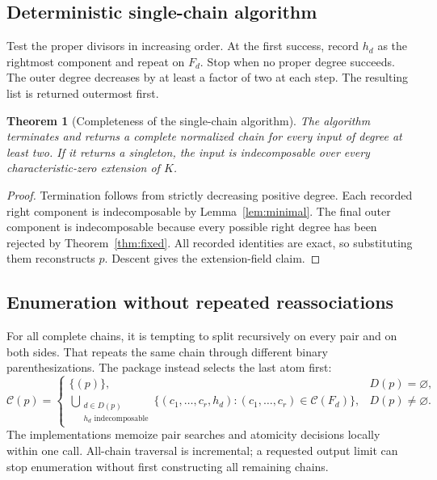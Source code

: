 \documentclass[11pt,a4paper]{article}
\numberwithin{equation}{section}
\newtheorem{theorem}{Theorem}[section]
\theoremstyle{definition}
\theoremstyle{remark}
\begin{document}
\subsection{Deterministic single-chain algorithm}
Test the proper divisors in increasing order. At the first success, record
$h_d$ as the rightmost component and repeat on $F_d$. Stop when no proper
degree succeeds. The outer degree decreases by at least a factor of two at
each step. The resulting list is returned outermost first.

\begin{theorem}[Completeness of the single-chain algorithm]
The algorithm terminates and returns a complete normalized chain for every
input of degree at least two. If it returns a singleton, the input is
indecomposable over every characteristic-zero extension of $K$.
\end{theorem}
\begin{proof}
Termination follows from strictly decreasing positive degree. Each recorded
right component is indecomposable by Lemma~\ref{lem:minimal}. The final outer
component is indecomposable because every possible right degree has been
rejected by Theorem~\ref{thm:fixed}. All recorded identities are exact, so
substituting them reconstructs $p$. Descent gives the extension-field claim.
\end{proof}

\subsection{Enumeration without repeated reassociations}
For all complete chains, it is tempting to split recursively on every pair
and on both sides. That repeats the same chain through different binary
parenthesizations. The package instead selects the last atom first:
\begin{equation}
 \mathcal C(p)=
 \begin{cases}
  \{(p)\}, & D(p)=\varnothing,\\[2pt]
  \displaystyle\bigcup_{\substack{d\in D(p)\\h_d\text{ indecomposable}}}
       \{(c_1,\ldots,c_r,h_d):
                          (c_1,\ldots,c_r)\in\mathcal C(F_d)\},
       & D(p)\ne\varnothing.
 \end{cases}
 \label{eq:enumeration}
\end{equation}
The implementations memoize pair searches and atomicity decisions locally
within one call. All-chain traversal is incremental; a requested output limit
can stop enumeration without first constructing all remaining chains.
\end{document}
